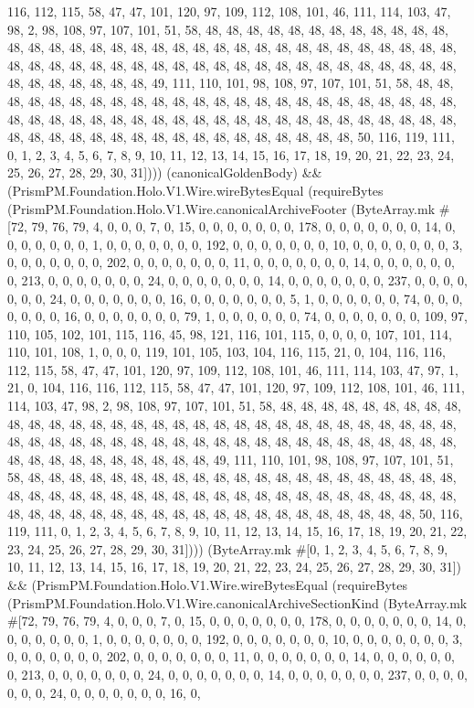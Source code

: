 \documentclass[11pt]{article}
\begin{document}
116, 112, 115, 58, 47, 47, 101, 120, 97, 109, 112, 108, 101, 46, 111, 114, 103, 47, 98, 2, 98, 108, 97, 107, 101, 51, 58, 48, 48, 48, 48, 48, 48, 48, 48, 48, 48, 48, 48, 48, 48, 48, 48, 48, 48, 48, 48, 48, 48, 48, 48, 48, 48, 48, 48, 48, 48, 48, 48, 48, 48, 48, 48, 48, 48, 48, 48, 48, 48, 48, 48, 48, 48, 48, 48, 48, 48, 48, 48, 48, 48, 48, 48, 48, 48, 48, 48, 48, 48, 48, 49, 111, 110, 101, 98, 108, 97, 107, 101, 51, 58, 48, 48, 48, 48, 48, 48, 48, 48, 48, 48, 48, 48, 48, 48, 48, 48, 48, 48, 48, 48, 48, 48, 48, 48, 48, 48, 48, 48, 48, 48, 48, 48, 48, 48, 48, 48, 48, 48, 48, 48, 48, 48, 48, 48, 48, 48, 48, 48, 48, 48, 48, 48, 48, 48, 48, 48, 48, 48, 48, 48, 48, 48, 48, 50, 116, 119, 111, 0, 1, 2, 3, 4, 5, 6, 7, 8, 9, 10, 11, 12, 13, 14, 15, 16, 17, 18, 19, 20, 21, 22, 23, 24, 25, 26, 27, 28, 29, 30, 31]))) (canonicalGoldenBody) \&\& (PrismPM.Foundation.Holo.V1.Wire.wireBytesEqual (requireBytes (PrismPM.Foundation.Holo.V1.Wire.canonicalArchiveFooter (ByteArray.mk \#[72, 79, 76, 79, 4, 0, 0, 0, 7, 0, 15, 0, 0, 0, 0, 0, 0, 0, 178, 0, 0, 0, 0, 0, 0, 0, 14, 0, 0, 0, 0, 0, 0, 0, 1, 0, 0, 0, 0, 0, 0, 0, 192, 0, 0, 0, 0, 0, 0, 0, 10, 0, 0, 0, 0, 0, 0, 0, 3, 0, 0, 0, 0, 0, 0, 0, 202, 0, 0, 0, 0, 0, 0, 0, 11, 0, 0, 0, 0, 0, 0, 0, 14, 0, 0, 0, 0, 0, 0, 0, 213, 0, 0, 0, 0, 0, 0, 0, 24, 0, 0, 0, 0, 0, 0, 0, 14, 0, 0, 0, 0, 0, 0, 0, 237, 0, 0, 0, 0, 0, 0, 0, 24, 0, 0, 0, 0, 0, 0, 0, 16, 0, 0, 0, 0, 0, 0, 0, 5, 1, 0, 0, 0, 0, 0, 0, 74, 0, 0, 0, 0, 0, 0, 0, 16, 0, 0, 0, 0, 0, 0, 0, 79, 1, 0, 0, 0, 0, 0, 0, 74, 0, 0, 0, 0, 0, 0, 0, 109, 97, 110, 105, 102, 101, 115, 116, 45, 98, 121, 116, 101, 115, 0, 0, 0, 0, 107, 101, 114, 110, 101, 108, 1, 0, 0, 0, 119, 101, 105, 103, 104, 116, 115, 21, 0, 104, 116, 116, 112, 115, 58, 47, 47, 101, 120, 97, 109, 112, 108, 101, 46, 111, 114, 103, 47, 97, 1, 21, 0, 104, 116, 116, 112, 115, 58, 47, 47, 101, 120, 97, 109, 112, 108, 101, 46, 111, 114, 103, 47, 98, 2, 98, 108, 97, 107, 101, 51, 58, 48, 48, 48, 48, 48, 48, 48, 48, 48, 48, 48, 48, 48, 48, 48, 48, 48, 48, 48, 48, 48, 48, 48, 48, 48, 48, 48, 48, 48, 48, 48, 48, 48, 48, 48, 48, 48, 48, 48, 48, 48, 48, 48, 48, 48, 48, 48, 48, 48, 48, 48, 48, 48, 48, 48, 48, 48, 48, 48, 48, 48, 48, 48, 49, 111, 110, 101, 98, 108, 97, 107, 101, 51, 58, 48, 48, 48, 48, 48, 48, 48, 48, 48, 48, 48, 48, 48, 48, 48, 48, 48, 48, 48, 48, 48, 48, 48, 48, 48, 48, 48, 48, 48, 48, 48, 48, 48, 48, 48, 48, 48, 48, 48, 48, 48, 48, 48, 48, 48, 48, 48, 48, 48, 48, 48, 48, 48, 48, 48, 48, 48, 48, 48, 48, 48, 48, 48, 50, 116, 119, 111, 0, 1, 2, 3, 4, 5, 6, 7, 8, 9, 10, 11, 12, 13, 14, 15, 16, 17, 18, 19, 20, 21, 22, 23, 24, 25, 26, 27, 28, 29, 30, 31]))) (ByteArray.mk \#[0, 1, 2, 3, 4, 5, 6, 7, 8, 9, 10, 11, 12, 13, 14, 15, 16, 17, 18, 19, 20, 21, 22, 23, 24, 25, 26, 27, 28, 29, 30, 31]) \&\& (PrismPM.Foundation.Holo.V1.Wire.wireBytesEqual (requireBytes (PrismPM.Foundation.Holo.V1.Wire.canonicalArchiveSectionKind (ByteArray.mk \#[72, 79, 76, 79, 4, 0, 0, 0, 7, 0, 15, 0, 0, 0, 0, 0, 0, 0, 178, 0, 0, 0, 0, 0, 0, 0, 14, 0, 0, 0, 0, 0, 0, 0, 1, 0, 0, 0, 0, 0, 0, 0, 192, 0, 0, 0, 0, 0, 0, 0, 10, 0, 0, 0, 0, 0, 0, 0, 3, 0, 0, 0, 0, 0, 0, 0, 202, 0, 0, 0, 0, 0, 0, 0, 11, 0, 0, 0, 0, 0, 0, 0, 14, 0, 0, 0, 0, 0, 0, 0, 213, 0, 0, 0, 0, 0, 0, 0, 24, 0, 0, 0, 0, 0, 0, 0, 14, 0, 0, 0, 0, 0, 0, 0, 237, 0, 0, 0, 0, 0, 0, 0, 24, 0, 0, 0, 0, 0, 0, 0, 16, 0, 
\end{document}
